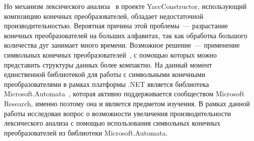 Но механизм лексического анализа~\cite{polubelova} в проекте YaccConstructor, использующий композицию конечных преобразователей, обладает недостаточной производительностью. Вероятная причина этой проблемы~--- разрастание конечных преобразователей на больших алфавитах, так как обработка большого количества дуг занимает много времени. Возможное решение~--- применение символьных конечных преобразователей~\cite{st}, с помощью которых можно представить структуры данных более компактно. 
На данный момент единственной библиотекой для работы с символьными конечными преобразователями в рамках платформы .NET является библиотека Microsoft.Automata~\cite{MSAUrl}, которая активно поддерживается сообществом Microsoft Research, именно поэтому она и является предметом изучения.
В рамках данной работы исследован вопрос о возможности увеличения производительности лексического анализа с помощью использования символьных конечных преобразователей из библиотеки Microsoft.Automata.
